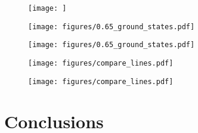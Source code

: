 \documentclass[pra,twocolumn]{revtex4-2}
\begin{document}
\begin{figure}
  \texttt{[image: ]}
  \caption{}
  \label{fig:mu}
\end{figure}

\begin{figure}
  \texttt{[image: figures/0.65\_ground\_states.pdf]}
  \caption{}
  \label{fig:fake_collapse}
\end{figure}

\begin{figure}
  \texttt{[image: figures/0.65\_ground\_states.pdf]}
  \caption{}
  \label{fig:heatmap}
\end{figure}

\begin{figure}
  \texttt{[image: figures/compare\_lines.pdf]}
  \caption{}
  \label{fig:discontinuity}
\end{figure}

\begin{figure}
  \texttt{[image: figures/compare\_lines.pdf]}
  \caption{}
  \label{fig:collapse}
\end{figure}


\section{Conclusions}\label{sec:conclusions}

\end{document}
